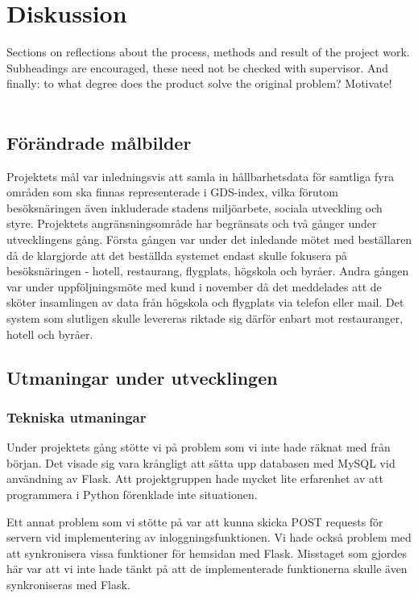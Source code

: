 \documentclass[12pt]{article}
\begin{document}
\section{Diskussion}
Sections on reflections about the process, methods and result of the project work. Subheadings are encouraged, these need not be checked with supervisor. And finally: to what degree does the product solve the original problem? Motivate!\\\\
\subsection{Förändrade målbilder}

Projektets mål var inledningsvis att samla in hållbarhetsdata för samtliga fyra områden som ska finnas representerade i GDS-index, vilka förutom besöksnäringen även inkluderade stadens miljöarbete, sociala utveckling och styre. Projektets angränsningsområde har begränsats och två gånger under utvecklingens gång. Första gången var under det inledande mötet med beställaren då de klargjorde att det beställda systemet endast skulle fokusera på besöksnäringen - hotell, restaurang, flygplats, högskola och byråer. Andra gången var under uppföljningsmöte med kund i november då det meddelades att de sköter insamlingen av data från högskola och flygplats via telefon eller mail. Det system som slutligen skulle levereras riktade sig därför enbart mot restauranger, hotell och byråer. 


\subsection{Utmaningar under utvecklingen}

\subsubsection{Tekniska utmaningar}
Under projektets gång stötte vi på problem som vi inte hade räknat med från början. Det visade sig vara krångligt att sätta upp databasen med MySQL vid användning av Flask. Att projektgruppen hade mycket lite erfarenhet av att programmera i Python förenklade inte situationen.  

Ett annat problem som vi stötte på var att kunna skicka POST requests för servern vid implementering av inloggningsfunktionen. Vi hade också problem med att synkronisera vissa funktioner för hemsidan med Flask. Misstaget som gjordes här var att vi inte hade tänkt på att de implementerade funktionerna skulle även synkroniseras med Flask.
\end{document}
